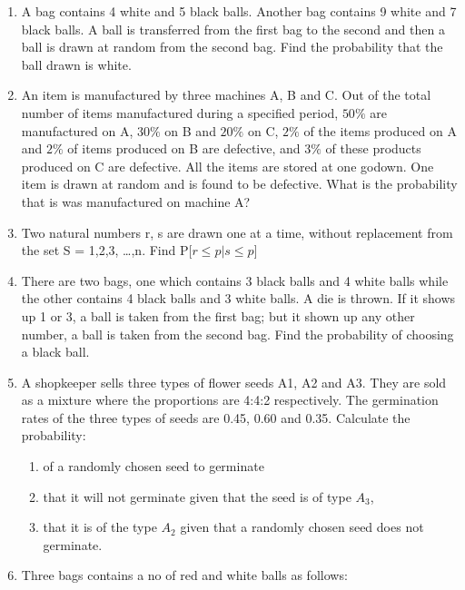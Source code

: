 \begin{enumerate}
\solution
\\

\item A bag contains 4 white and 5 black balls. Another bag contains 9 white and 7 black balls. A ball is transferred from the first bag to the second and then a ball is drawn at random from the second bag. Find the probability that the ball drawn is white.
\\

\item An item is manufactured by three machines A, B and C. Out of the total number of items manufactured during a specified period, $50\%$ are manufactured on A, $30\%$ on B and $20\%$ on C, $2\%$ of the items produced on A and $2\%$ of items produced on B are defective, and $3\%$ of these products produced on C are defective. All the items are stored at one godown. One item is drawn at random and is found to be defective. What is the probability that is was manufactured on machine A?
\solution
\\

\item Two natural numbers r, s are drawn one at a time, without replacement from
the set S = {1,2,3, \ldots,n}. Find P[$r\le p|s\le p$]

\item There are two bags, one which contains 3 black balls and 4 white balls while the other contains 4 black balls and 3 white balls. A die is thrown. If it shows up 1 or 3, a ball is taken from the first bag; but it shown up any other number, a ball is taken from the second bag. Find the probability of choosing a black ball.
\\

\item A shopkeeper sells three types of flower seeds A1, A2 and A3. They are sold as a mixture where the proportions are 4:4:2 respectively. The germination rates of the three types of seeds are 0.45, 0.60 and 0.35. Calculate the probability:
\begin{enumerate}
\item of a randomly chosen seed to germinate
\item that it will not germinate given that the seed is of type $A_3$,
\item that it is of the type $A_2$ given that a randomly chosen seed does not germinate.
\end{enumerate}

\item Three bags contains a no of red and white balls as follows:

\end{enumerate}
